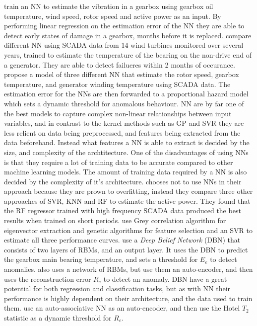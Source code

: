 \textcite{ANN_damage_detection_gearbox_wt} train an NN to estimate the vibration in a gearbox using gearbox oil temperature, wind speed, rotor speed and active power as an input. 
By performing linear regression on the estimation error of the NN they are able to detect early states of damage in a gearbox, months before it is replaced. 
\textcite{detecting_malfunctions_wt_generator_bearings_generic_vs_specific_models} compare different NN using SCADA data from 14 wind turbines monitored over several years, trained to estimate the temperature of the bearing on the non-drive end of a generator. 
They are able to detect failueres within 2 months of occurance. 
\textcite{health_cond_model_nn_proportional_hazard_models} propose a model of three different NN that estimate the rotor speed, gearbox temperature, and generator winding temperature using SCADA data. 
The estimation error for the NNs are then forwarded to a proportional hazard model which sets a dynamic threshold for anomalous behaviour. 
NN are by far one of the best models to capture complex non-linear relationships between input variables, and in contrast to the kernel methods such as GP and SVR they are less relient on data being preprocessed, and features being extracted from the data beforehand. 
Instead what features a NN is able to extract is decided by the size, and complexity of the archtitecture. 
One of the disadvantages of using NNs is that they require a lot of training data to be accurate compared to other machine learning models. 
The amount of training data required by a NN is also decided by the complexity of it's architecture. 
\textcite{high_freq_scada_perf_monit_sensitivity} chooses not to use NNs in their approach because they are prown to overfitting, instead they compare three other approaches of SVR, KNN and RF to estimate the active power. 
They found that the RF regressor trained with high frequency SCADA data produced the best results when trained on short periods. 
\textcite{abnormal_detection_scada_data_mining} use Grey correlation algorithm for eigenvector extraction and genetic algorithms for feature selection and an SVR to estimate all three performance curves. \bigskip
\textcite{DBN_chicken_swarm_optim} use a \textit{Deep Belief Network} (DBN) that consists of two layers of RBMs, and an output layer. 
It uses the DBN to predict the gearbox main bearing temperature, and sets a threshold for $E_e$ to detect anomalies. 
\textcite{AD_and_fault_analysis_wt_DAE} also uses a network of RBMs, but use them an auto-encoder, and then uses the reconstruction error $R_e$ to detect an anomaly. 
DBN have a great potential for both regression and classification tasks, but as with NN their performance is highly dependent on their architecture, and the data used to train them. 
\textcite{auto_associative_nn_wt_fault_detection} use an auto-associative NN as an auto-encoder, and then use the Hotel $T_2$ statistic as a dynamic threshold for $R_e$. 

